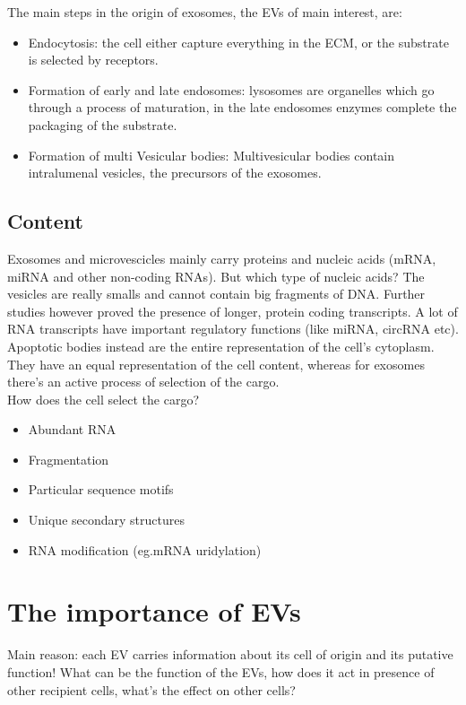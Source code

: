 The main steps in the origin of exosomes, the EVs of main interest, are:
\begin{itemize}
\item Endocytosis: the cell either capture everything in the ECM, or the substrate is selected by receptors.
\item Formation of early and late endosomes: lysosomes are organelles which go through a process of maturation, in the late endosomes enzymes complete the packaging of the substrate.
\item Formation of multi Vesicular bodies: Multivesicular bodies contain intralumenal vesicles, the precursors of the exosomes.
\end{itemize}

\subsection{Content}
Exosomes and microvescicles mainly carry proteins and nucleic acids (mRNA, miRNA and other non-coding RNAs). But which type of nucleic acids? The vesicles are really smalls and cannot contain big fragments of DNA. Further studies however proved the presence of longer, protein coding transcripts. A lot of RNA transcripts have important regulatory functions (like miRNA, circRNA etc).
\\
Apoptotic bodies instead are the entire representation of the cell's cytoplasm. They have an equal representation of the cell content, whereas for exosomes there's an active process of selection of the cargo.
\\
How does the cell select the cargo?
\begin{itemize}
\item Abundant RNA
\item Fragmentation
\item Particular sequence motifs
\item Unique secondary structures
\item RNA modification (eg.mRNA uridylation)
\end{itemize}


\section{The importance of EVs}
Main reason: each EV carries information about its cell of origin and its putative function! What can be the function of the EVs, how does it act in presence of other recipient cells, what's the effect on other cells?

